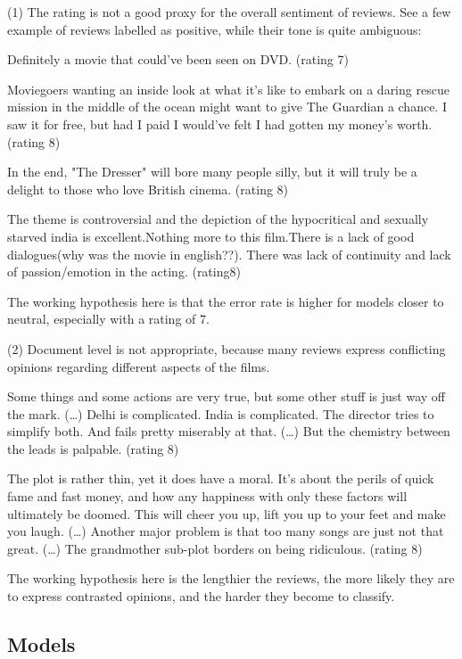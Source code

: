 \documentclass{article}
\begin{document}
(1) The rating is not a good proxy for the overall sentiment of reviews. See a few example of reviews labelled as positive, while their tone is quite ambiguous:
\begin{displayquote}
Definitely a movie that could've been seen on DVD. (rating 7)

Moviegoers wanting an inside look at what it's like to embark on a daring rescue mission in the middle of the ocean might want to give The Guardian a chance. I saw it for free, but had I paid I would've felt I had gotten my money's worth. (rating 8)

In the end, "The Dresser" will bore many people silly, but it will truly be a delight to those who love British cinema. (rating 8)

The theme is controversial and the depiction of the hypocritical and sexually starved india is excellent.Nothing more to this film.There is a lack of good dialogues(why was the movie in english??). There was lack of continuity and lack of passion/emotion in the acting. (rating8)
\end{displayquote}
The working hypothesis here is that the error rate is higher for models closer to neutral, especially with a rating of 7.

(2) Document level is not appropriate, because many reviews express conflicting opinions regarding different aspects of the films.
\begin{displayquote}
Some things and some actions are very true, but some other stuff is just way off the mark. (…) Delhi is complicated. India is complicated. The director tries to simplify both. And fails pretty miserably at that. (…) But the chemistry between the leads is palpable. (rating 8)

The plot is rather thin, yet it does have a moral. It's about the perils of quick fame and fast money, and how any happiness with only these factors will ultimately be doomed. This will cheer you up, lift you up to your feet and make you laugh. (…) Another major problem is that too many songs are just not that great. (…) The grandmother sub-plot borders on being ridiculous. (rating 8)
\end{displayquote}
The working hypothesis here is the lengthier the reviews, the more likely they are to express contrasted opinions, and the harder they become to classify.

\subsection{Models}
\end{document}
